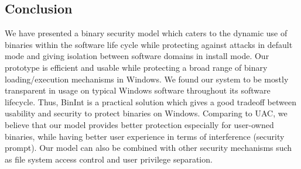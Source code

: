 \subsection{Conclusion}
\label{sec:binint-conc}

We have presented a binary security model which caters to the
dynamic use of binaries within the software life cycle
while protecting against attacks in default mode
and giving isolation between software domains in install mode.
Our prototype is efficient and usable while
protecting a broad range of binary loading/execution mechanisms in Windows.
We found our system to be mostly transparent in usage on typical
Windows software throughout its software lifecycle.
Thus, BinInt is a practical solution
which gives a good tradeoff between usability and security
to protect binaries on Windows.
Comparing to UAC, we believe that our model provides better protection
especially for user-owned binaries, while having better user experience
in terms of interference (security prompt).
Our model can also be combined with other security mechanisms such
as file system access control and user privilege separation.
